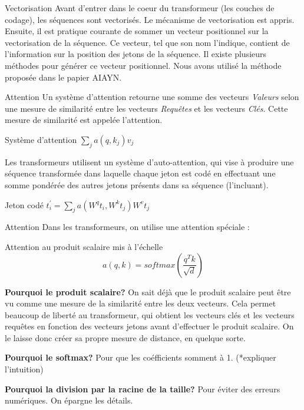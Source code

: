 \documentclass{beamer}
\begin{document}
\begin{frame}{Vectorisation}
    Avant d'entrer dans le coeur du transformeur (les couches de codage), les séquences sont 
    vectorisés. Le mécanisme de vectorisation est appris. Ensuite, il est
    pratique courante de sommer un vecteur positionnel sur 
    la vectorisation de la séquence. Ce vecteur, tel que son nom l'indique,
    contient de l'information sur la position des jetons de la séquence.
    Il existe plusieurs méthodes pour générer ce vecteur positionnel. Nous avons 
    utilisé la méthode proposée dans le papier AIAYN.
\end{frame}

\begin{frame}{Attention}
Un système d'attention retourne une somme des vecteurs \emph{Valeurs} selon 
une mesure de similarité entre les vecteurs \emph{Requêtes} et les vecteurs \emph{Clés}.
Cette mesure de similarité est appelée l'attention.
    \begin{block}{Système d'attention}
        $\sum_{j} a(q, k_j) v_j$
    \end{block}
Les transformeurs utilisent un système d'auto-attention, qui vise à produire
une séquence transformée dans laquelle chaque jeton est codé en effectuant une somme pondérée des
autres jetons présents dans sa séquence (l'incluant).
    \begin{block}{Jeton codé}
        $t_{i}^{'} = \sum_{j} a(W^{q}t_{i}, W^{k}t_j) W^{v}t_j$
    \end{block}
\end{frame}

\begin{frame}{Attention}
Dans les transformeurs, on utilise une attention spéciale :
\begin{block}{Attention au produit scalaire mis à l'échelle}
    \[ a(q, k) = softmax( \frac{q^Tk}{\sqrt{d}}) \]
\end{block}


{\bf Pourquoi le produit scalaire?}
On sait déjà que le produit scalaire peut être vu comme une mesure de la similarité entre
les deux vecteurs. Cela permet beaucoup de liberté au transformeur, qui obtient les vecteurs clés et les vecteurs requêtes en fonction des vecteurs jetons avant d'effectuer le produit scalaire. On le laisse donc créer sa propre mesure de distance, en quelque sorte.

\end{frame}

\begin{frame}{}
    
{\bf Pourquoi le softmax?}
Pour que les coéfficients somment à 1. (*expliquer l'intuition)

{\bf Pourquoi la division par la racine de la taille? }
Pour éviter des erreurs numériques. On épargne les détails.

\end{frame}
\end{document}
